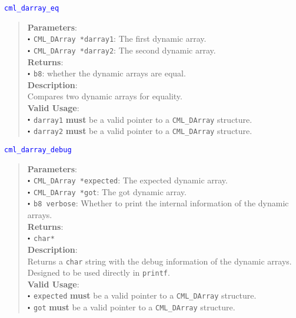 \documentclass[a4paper,oneside,8pt]{extarticle}
\newcommand{\function}[1]{
  \noindent\textcolor{blue}{\texttt{#1}}
  \vspace{-0.3em}
}
\renewcommand{\dot}{\raisebox{0.3ex}{\scalebox{0.6}{$\bullet$}}}
\theoremstyle{definition}
\begin{document}
\function{cml\_darray\_eq}
\begin{quote}
  \textbf{Parameters}: \\
  $\dot$ \texttt{CML\_DArray *darray1}: The first dynamic array. \\
  $\dot$ \texttt{CML\_DArray *darray2}: The second dynamic array. \\
  \textbf{Returns}: \\
  $\dot$ \texttt{b8}: whether the dynamic arrays are equal. \\

  \vspace{-0.75em}
  \textbf{Description}: \\
  Compares two dynamic arrays for equality. \\

  \vspace{-0.75em}
  \textbf{Valid Usage}: \\
  $\dot$ \texttt{darray1} \textbf{must} be a valid pointer to a \texttt{CML\_DArray} structure. \\
  $\dot$ \texttt{darray2} \textbf{must} be a valid pointer to a \texttt{CML\_DArray} structure. \\
\end{quote}

\function{cml\_darray\_debug}
\begin{quote}
  \textbf{Parameters}: \\
  $\dot$ \texttt{CML\_DArray *expected}: The expected dynamic array. \\
  $\dot$ \texttt{CML\_DArray *got}: The got dynamic array. \\
  $\dot$ \texttt{b8 verbose}: Whether to print the internal information of the dynamic arrays. \\
  \textbf{Returns}: \\
  $\dot$ \texttt{char*} \\

  \vspace{-0.75em}
  \textbf{Description}: \\
  Returns a \texttt{char} string with the debug information of the dynamic arrays. Designed to be used directly in \texttt{printf}. \\
  
  \vspace{-0.75em}
  \textbf{Valid Usage}: \\
  $\dot$ \texttt{expected} \textbf{must} be a valid pointer to a \texttt{CML\_DArray} structure. \\
  $\dot$ \texttt{got} \textbf{must} be a valid pointer to a \texttt{CML\_DArray} structure. \\
\end{quote}
\end{document}
